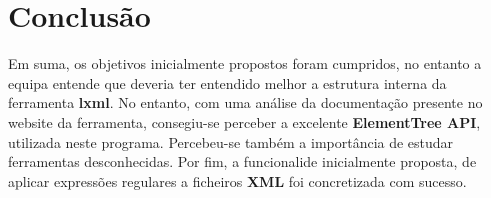 \documentclass[11pt,a4paper]{report}%
\begin{document}
\chapter{Conclusão} 
Em suma, os objetivos inicialmente propostos foram cumpridos, no entanto a equipa entende que deveria ter entendido melhor a estrutura interna da ferramenta \textbf{lxml}. No entanto, com uma análise da documentação presente no website da ferramenta, consegiu-se perceber a excelente \textbf{ElementTree API}, utilizada neste programa. Percebeu-se também a importância de estudar ferramentas desconhecidas.
Por fim, a funcionalide inicialmente proposta, de aplicar expressões regulares a ficheiros \textbf{XML} foi concretizada com sucesso.
\end{document}
